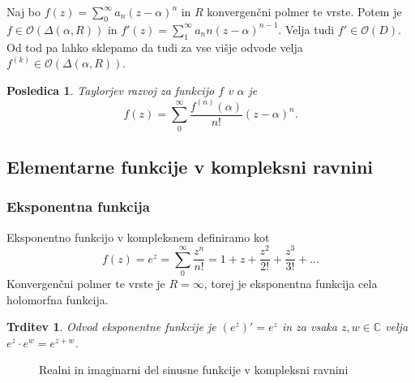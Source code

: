 \documentclass[10pt, a4paper]{article}
\newtheorem{posledica}[izr]{Posledica}
\newtheorem{trditev}[izr]{Trditev}
\newcommand{\C}{\mathbb {C}}
\begin{document}
Naj bo $f(z) = \sum_0 ^\infty a_n (z - \alpha)^n$ in $R$ konvergenčni polmer te vrste.
Potem je $f \in \mathcal{O} (\Delta (\alpha, R))$ in $f' (z) = \sum_1 ^\infty a_n n (z - \alpha)^{n - 1}$.
Velja tudi $f' \in \mathcal{O} (D)$. Od tod pa lahko sklepamo da tudi za vse višje odvode velja
$f^{(k)} \in \mathcal{O} (\Delta (\alpha, R))$.

\begin{posledica}
  Taylorjev razvoj za funkcijo $f$ v $\alpha$ je
  $$f (z) = \sum_0 ^\infty \frac{f^{(n)} (\alpha)}{n!} (z - \alpha)^{n}.$$
\end{posledica}

\subsection{Elementarne funkcije v kompleksni ravnini}

\subsubsection{Eksponentna funkcija}

Eksponentno funkcijo v kompleksnem definiramo kot 
$$f(z) = e^z = \sum_0 ^\infty \frac{z^n}{n!} = 1 + z + \frac{z^2}{2!} + \frac{z^3}{3!} + \dots$$
Konvergenčni polmer te vrste je $R = \infty$, torej je eksponentna funkcija cela holomorfna funkcija.
\begin{trditev}
  Odvod eksponentne funkcije je $(e^z)' = e^z$ in
  za vsaka $z, w \in \C$ velja $e^z \cdot e^w = e^{z + w}$.
\end{trditev}

\begin{figure}[h!]%
  \centering
  \qquad
  \caption{Realni in imaginarni del sinusne funkcije v kompleksni ravnini}%
\end{figure}
\end{document}
